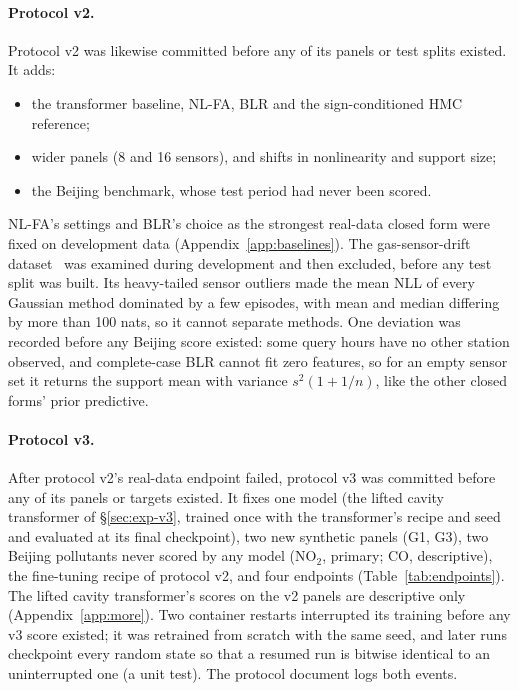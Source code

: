 

\paragraph{Protocol v2.}
Protocol v2 was likewise committed before any of its panels or test splits existed. It adds:
\begin{itemize}
  \item the transformer baseline, NL-FA, BLR and the sign-conditioned HMC reference;
  \item wider panels (8 and 16 sensors), and shifts in nonlinearity and support size;
  \item the Beijing benchmark, whose test period had never been scored.
\end{itemize}
NL-FA's settings and BLR's choice as the strongest real-data closed form were fixed on development data
(Appendix~\ref{app:baselines}). The gas-sensor-drift dataset~\citep{vergara2012drift} was examined during development
and then excluded, before any test split was built. Its heavy-tailed sensor outliers made the mean NLL of every
Gaussian method dominated by a few episodes, with mean and median differing by more than 100 nats, so it cannot
separate methods. One deviation was recorded before any Beijing score existed: some query hours have no other station
observed, and complete-case BLR cannot fit zero features, so for an empty sensor set it returns the support mean with
variance $s^2(1+1/n)$, like the other closed forms' prior predictive.

\paragraph{Protocol v3.}
After protocol v2's real-data endpoint failed, protocol v3 was committed before any of its panels or targets existed.
It fixes one model (the lifted cavity transformer of \S\ref{sec:exp-v3}, trained once with the transformer's recipe
and seed and evaluated at its final checkpoint), two new synthetic panels (G1, G3), two Beijing pollutants never
scored by any model (NO$_2$, primary; CO, descriptive), the fine-tuning recipe of protocol v2, and four endpoints
(Table~\ref{tab:endpoints}). The lifted cavity transformer's scores on the v2 panels are descriptive only
(Appendix~\ref{app:more}). Two container restarts interrupted its training before any v3 score existed; it was retrained
from scratch with the same seed, and later runs checkpoint every random state so that a resumed run is bitwise
identical to an uninterrupted one (a unit test). The protocol document logs both events.

